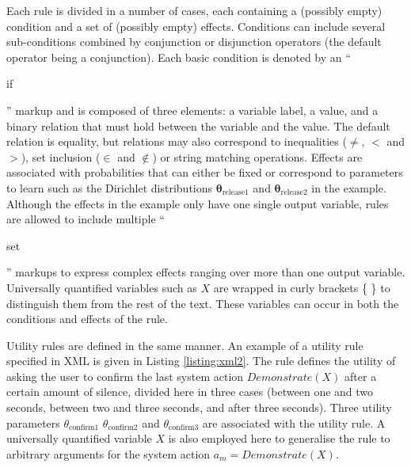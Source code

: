 Each rule is divided in a number of cases, each containing a (possibly empty) condition and a set of (possibly empty) effects.  Conditions can include several sub-conditions combined by conjunction or disjunction operators (the default operator being a conjunction). Each basic condition is denoted by an ``\begin{small}\textsf{if}\end{small}'' markup and is composed of three elements: a variable label, a value, and a binary relation that must hold between the variable and the value. The default relation is equality, but relations may also correspond to inequalities ($\neq$, $<$ and $>$), set inclusion ($\in$ and $\notin$) or string matching operations.   Effects are associated with probabilities that can either be fixed or correspond to parameters to learn such as the Dirichlet distributions $\boldsymbol\theta_{\text{release1}}$ and $\boldsymbol\theta_{\text{release2}}$ in the example.  Although the effects in the example only have one single output variable, rules are allowed to include multiple ``\begin{small}\textsf{set}\end{small}'' markups to express complex effects ranging over more than one output variable. Universally quantified variables such as $X$ are wrapped in curly brackets \{ \} to distinguish them from the rest of the text. These variables can occur in both the conditions and effects of the rule. 

Utility rules are defined in the same manner.  An example of a utility rule specified in XML is given in Listing \ref{listing:xml2}.  The rule defines the utility of asking the user to confirm the last system action $\mathit{Demonstrate}(X)$ after a certain amount of silence, divided here in three cases (between one and two seconds, between two and three seconds, and after three seconds).  Three utility parameters $\theta_{\text{confirm1}}$ $\theta_{\text{confirm2}}$ and $\theta_{\text{confirm3}}$ are associated with the utility rule.  A universally quantified variable $X$ is also employed here to generalise the rule to arbitrary arguments for the system action $a_m = \mathit{Demonstrate}(X)$. 

